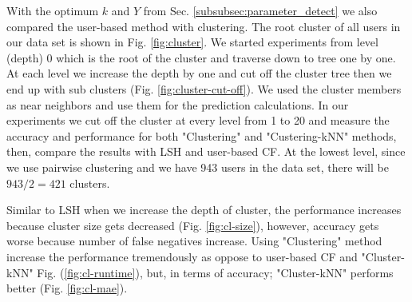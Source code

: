 \documentclass[conference]{IEEEtran}
\begin{document}
With the optimum $k$ and $Y$ from Sec. \ref{subsubsec:parameter_detect} we also
compared the user-based method with clustering. The root cluster of all users 
in our data set is shown in Fig. \ref{fig:cluster}. We started experiments from
level (depth) 0 which is the root of the cluster and traverse down to tree one 
by one. At each level we increase the depth by one and cut off the cluster tree
then we end up with sub clusters (Fig. \ref{fig:cluster-cut-off}). We used the 
cluster members as near neighbors and use them for the prediction calculations.
In our experiments we cut off the cluster at every  level from 1 to 20 and 
measure the accuracy and performance for both "Clustering" and "Custering-kNN" 
methods, then, compare the results with LSH and user-based CF. At the lowest 
level, since we use pairwise clustering and we have 943 users in the data set, 
there will be $943/2 = 421$ clusters. 

Similar to LSH when we increase the depth of cluster, the performance increases 
because cluster size gets decreased (Fig. \ref{fig:cl-size}), however, accuracy 
gets worse because number of false negatives increase. Using "Clustering" method increase the performance tremendously as oppose to user-based CF and "Cluster-kNN" 
Fig. (\ref{fig:cl-runtime}), but, in terms of accuracy; "Cluster-kNN" performs 
better (Fig. \ref{fig:cl-mae}). 
\end{document}
